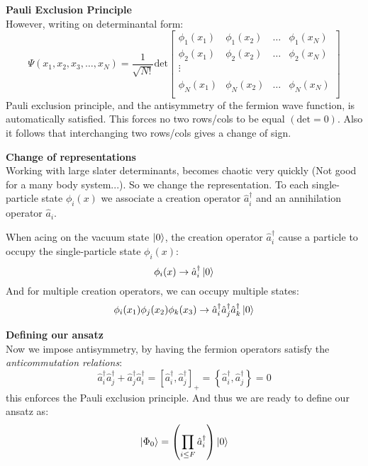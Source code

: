 \documentclass[UKenglish,aspectratio=169,12pt]{beamer}
\begin{document}
\begin{frame}
    \textbf{Pauli Exclusion Principle}\\
    However, writing on determinantal form:
    \[
        \Psi ( x_1,x_2,x_3,\dots ,x_N) = \frac{1}{\sqrt{N!}} \text{det} 
        \begin{bmatrix} 
         \phi_1 (x_1) & \phi_1(x_2) & \dots & \phi_1(x_N)\\ 
        \phi_2(x_1) & \phi_2 (x_2) & \dots & \phi_2(x_N)\\ 
         \vdots\\ \\
        \phi_N(x_1) & \phi_N(x_2) & \dots & \phi_N(x_N)\\ 
        \end{bmatrix}
    \]
    Pauli exclusion principle, and the antisymmetry of the fermion wave function, is automatically satisfied.
    This forces no two rows/cols to be equal $(\text{det}=0)$. Also it follows that interchanging two rows/cols gives a change of sign.
\end{frame}

\begin{frame}
    \textbf{Change of representations}\\
    Working with large slater determinants, becomes chaotic very quickly (Not good for a many body system...). So we change the representation.
    To each single-particle state $\phi_i(x)$ we associate a creation operator $\hat{a}^{\dagger} _i$ and an annihilation operator $\hat{a} _i$. 

    When acing on the vacuum state $\ket{ 0}$, the creation operator $\hat{a} ^{\dagger} _i$ cause a particle to occupy the single-particle state $\phi_i(x)$:
    \[
    \phi_i(x) \rightarrow \hat{a} ^{\dagger} _i \ket{0}
    \]
    And for multiple creation operators, we can occupy multiple states:
    \[
    \phi_i (x_1) \phi_j(x_2) \phi_k(x_3) \rightarrow \hat{a}^{\dagger}_i \hat{a}^{\dagger}_j \hat{a} ^{\dagger}_k \ket{0} 
    \]
  
\end{frame}

\begin{frame}
    \textbf{Defining our ansatz}\\
    Now we impose antisymmetry, by having the fermion operators satisfy the \textit{anticommutation relations}:
    \[
        \hat{a} ^{\dagger} _i \hat{a} ^{\dagger} _j  + \hat{a}_{j}^{\dagger} \hat{a}_{i}^{\dagger}= [\hat{a}^{\dagger}_i,\hat{a}^{\dagger}_j]_+ = \left\{\hat{a}^{\dagger}_i,\hat{a}^{\dagger}_j\right\} = 0
    \]
    this enforces the Pauli exclusion principle. And thus we are ready to define our ansatz as:
    \[
        \ket{\Phi_0} = \left(\prod_{i\leq F} \hat{a} ^{\dagger} _i\right) \ket{ 0}
    \]
\end{frame}
\end{document}
